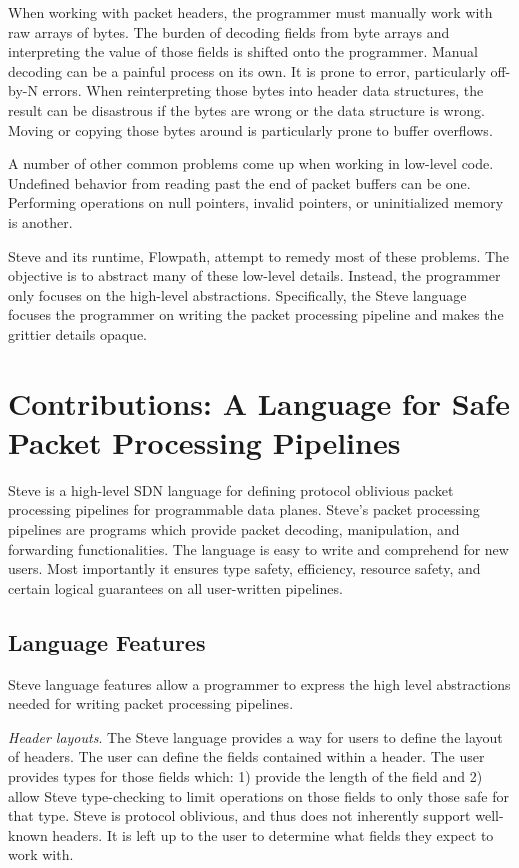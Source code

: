 When working with packet headers, the programmer must manually work with raw arrays of bytes. The burden of decoding fields from byte arrays and interpreting the value of those fields is shifted onto the programmer. Manual decoding can be a painful process on its own. It is prone to error, particularly off-by-N errors. When reinterpreting those bytes into header data structures, the result can be disastrous if the bytes are wrong or the data structure is wrong. Moving or copying those bytes around is particularly prone to buffer overflows.

A number of other common problems come up when working in low-level code. Undefined behavior from reading past the end of packet buffers can be one. Performing operations on null pointers, invalid pointers, or uninitialized memory is another.

Steve and its runtime, Flowpath, attempt to remedy most of these problems. The objective is to abstract many of these low-level details. Instead, the programmer only focuses on the high-level abstractions. Specifically, the Steve language focuses the programmer on writing the packet processing pipeline and makes the grittier details opaque.

\section{Contributions: A Language for Safe Packet Processing Pipelines}

Steve is a high-level SDN language for defining protocol oblivious packet processing pipelines for programmable data planes. Steve's packet processing pipelines are programs which provide packet decoding, manipulation, and forwarding functionalities. The language is easy to write and comprehend for new users. Most importantly it ensures type safety, efficiency, resource safety, and certain logical guarantees on all user-written pipelines.

\subsection{Language Features}

Steve language features allow a programmer to express the high level abstractions needed for writing packet processing pipelines.

\emph{Header layouts}. The Steve language provides a way for users to define the layout of headers. The user can define the fields contained within a header. The user provides types for those fields which: 1) provide the length of the field and 2) allow Steve type-checking to limit operations on those fields to only those safe for that type. Steve is protocol oblivious, and thus does not inherently support well-known headers. It is left up to the user to determine what fields they expect to work with.

